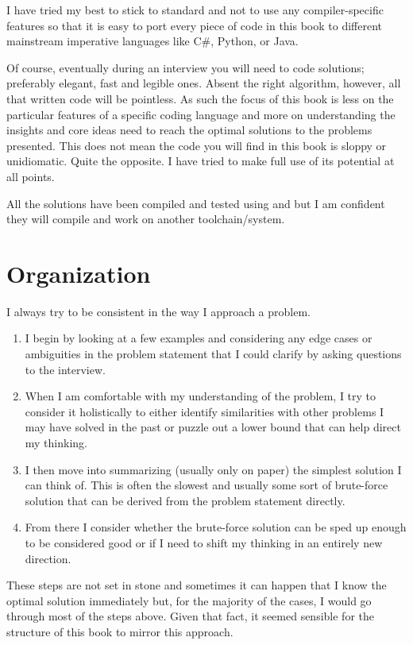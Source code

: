 I have tried my best to stick to standard \CC and not to use any compiler-specific features so that it is easy to port every piece of code in this book to different mainstream imperative languages like C\#, Python, or Java.  

Of course, eventually during an interview you will  need to code solutions; preferably elegant, fast and legible ones. Absent the right algorithm, however,   all that written code will be pointless. As such  the focus of this book is less on the particular features of a specific coding language and more on understanding the insights and core ideas need to reach the optimal solutions to the problems presented.
This does not mean the code you will find in this book is sloppy or \CC unidiomatic. Quite the opposite.  I have tried to make full use of its potential at all points. 

All the solutions have been compiled and tested using  and  but I am confident they will compile and work on another toolchain/system. 

\section*{Organization}
I always try to be consistent in the way I approach a problem. 
\begin{enumerate}
    \item I begin  by looking at a few examples and  considering any edge cases or ambiguities  in the problem statement that I could clarify by asking questions to the interview.
    \item When I am comfortable with my understanding of the problem, I try to consider it holistically to  either identify similarities with other problems I may have solved in the past or puzzle out a lower bound that can help direct my thinking. 
    \item I then move into summarizing (usually only on paper) the simplest solution I can think of. This is often the slowest and usually some sort of brute-force solution that can be derived from the problem statement directly.  
    \item  From there I consider whether the brute-force solution can be sped up enough to be considered good or if I need to shift my thinking in an entirely new direction.
\end{enumerate}

These steps are not set in stone and sometimes it can happen that I know the optimal solution immediately but,  for the majority of the cases, I would go through most of the steps above. Given that fact, it seemed sensible for the structure of this book to mirror this approach.  

